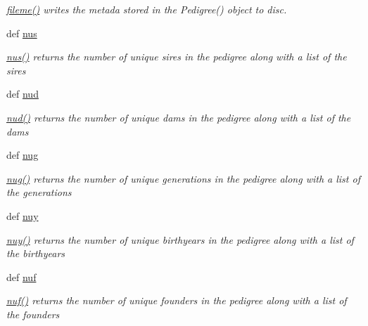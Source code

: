\begin{DoxyCompactItemize}
\begin{DoxyCompactList}\small\item\em \hyperlink{classPyPedal_1_1pyp__classes_1_1Pedigree_a009aa82eb9e76635475f092c269a719f}{fileme()} writes the metada stored in the Pedigree() object to disc. \item\end{DoxyCompactList}\item 
def \hyperlink{classPyPedal_1_1pyp__classes_1_1Pedigree_ad89f110b30544721eeaa945e50f467ff}{nus}
\begin{DoxyCompactList}\small\item\em \hyperlink{classPyPedal_1_1pyp__classes_1_1Pedigree_ad89f110b30544721eeaa945e50f467ff}{nus()} returns the number of unique sires in the pedigree along with a list of the sires \item\end{DoxyCompactList}\item 
def \hyperlink{classPyPedal_1_1pyp__classes_1_1Pedigree_a5da0b261e57cab87dd06af5e07aeb55e}{nud}
\begin{DoxyCompactList}\small\item\em \hyperlink{classPyPedal_1_1pyp__classes_1_1Pedigree_a5da0b261e57cab87dd06af5e07aeb55e}{nud()} returns the number of unique dams in the pedigree along with a list of the dams \item\end{DoxyCompactList}\item 
def \hyperlink{classPyPedal_1_1pyp__classes_1_1Pedigree_acc0248a985179c7c58a41d71b4e11799}{nug}
\begin{DoxyCompactList}\small\item\em \hyperlink{classPyPedal_1_1pyp__classes_1_1Pedigree_acc0248a985179c7c58a41d71b4e11799}{nug()} returns the number of unique generations in the pedigree along with a list of the generations \item\end{DoxyCompactList}\item 
def \hyperlink{classPyPedal_1_1pyp__classes_1_1Pedigree_a350271baa0007e5c9e0fd5652f29c399}{nuy}
\begin{DoxyCompactList}\small\item\em \hyperlink{classPyPedal_1_1pyp__classes_1_1Pedigree_a350271baa0007e5c9e0fd5652f29c399}{nuy()} returns the number of unique birthyears in the pedigree along with a list of the birthyears \item\end{DoxyCompactList}\item 
def \hyperlink{classPyPedal_1_1pyp__classes_1_1Pedigree_a3b7ebee81bdb56eb9343795e2faa9611}{nuf}
\begin{DoxyCompactList}\small\item\em \hyperlink{classPyPedal_1_1pyp__classes_1_1Pedigree_a3b7ebee81bdb56eb9343795e2faa9611}{nuf()} returns the number of unique founders in the pedigree along with a list of the founders \item\end{DoxyCompactList}\end{DoxyCompactItemize}
